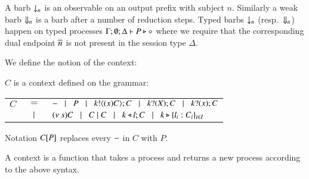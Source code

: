 A barb $\downarrow_{n}$ is an observable on an output prefix with subject $n$.
Similarly a weak barb $\Downarrow_{n}$ is a barb after a number of reduction steps.
Typed barbs $\downarrow_{n}$ (resp.\ $\Downarrow_{n}$)
happen on typed processes $\Gamma; \emptyset; \Delta \vdash P \triangleright \diamond$
where we require that the corresponding dual endpoint $\overline{n}$ is not present
in the session type $\Delta$.

We define the notion of the context:

\begin{definition}[Context]\rm
	$C$ is a context defined on the grammar:

	\begin{tabular}{rcl}
		$C$ &$=$& %
		$- \;\;\;|\;\;\; P \;\;\;|\;\;\; k ! \langle (x)C \rangle ; C \;\;\;|\;\;\; k ? (X) ; C \;\;\;|\;\;\; k ? (x) ; C$ \\
		& $\;\;\;|\;\;\;$ & $(\nu\ s) C \;\;\;|\;\;\; C \;|\; C \;\;\;|\;\;\; k \triangleleft l ; C \;\;\;|\;\;\; k \triangleright \{l_i:C_i\}_{i \in I}$
	\end{tabular}

	Notation $C[P]$ replaces every $-$ in $C$ with $P$.
\end{definition}

A context is a function that takes a process and returns a new process
according to the above syntax.



